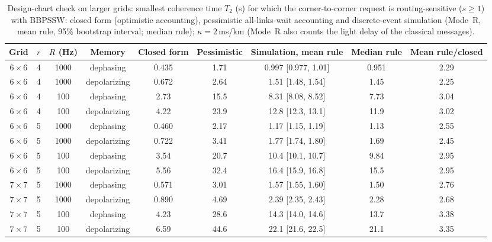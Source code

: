 \begin{table}[!t]
\centering
\caption{Design-chart check on larger grids: smallest coherence time $T_2$ (s) for which the corner-to-corner request is routing-sensitive ($s\ge1$) with BBPSSW: closed form (optimistic accounting), pessimistic all-links-wait accounting and discrete-event simulation (Mode~R, mean rule, 95\% bootstrap interval; median rule); $\kappa=2$\,ms/km (Mode~R also counts the light delay of the classical messages).}
\label{tab:dessix}
\footnotesize
\setlength{\tabcolsep}{4pt}
\begin{tabular}{ccccccccc}
\toprule
Grid & $r$ & $R$ (Hz) & Memory & Closed form & Pessimistic & Simulation, mean rule & Median rule & Mean rule/closed \\
\midrule
$6\times6$ & 4 & 1000 & dephasing & 0.435 & 1.71 & 0.997 [0.977, 1.01] & 0.951 & 2.29\\
$6\times6$ & 4 & 1000 & depolarizing & 0.672 & 2.64 & 1.51 [1.48, 1.54] & 1.45 & 2.25\\
$6\times6$ & 4 & 100 & dephasing & 2.73 & 15.5 & 8.31 [8.08, 8.52] & 7.73 & 3.04\\
$6\times6$ & 4 & 100 & depolarizing & 4.22 & 23.9 & 12.8 [12.3, 13.1] & 11.9 & 3.02\\
$6\times6$ & 5 & 1000 & dephasing & 0.460 & 2.17 & 1.17 [1.15, 1.19] & 1.13 & 2.55\\
$6\times6$ & 5 & 1000 & depolarizing & 0.722 & 3.41 & 1.77 [1.74, 1.80] & 1.69 & 2.45\\
$6\times6$ & 5 & 100 & dephasing & 3.54 & 20.7 & 10.4 [10.1, 10.7] & 9.84 & 2.95\\
$6\times6$ & 5 & 100 & depolarizing & 5.56 & 32.4 & 16.4 [15.9, 16.8] & 15.5 & 2.95\\
$7\times7$ & 5 & 1000 & dephasing & 0.571 & 3.01 & 1.57 [1.55, 1.60] & 1.50 & 2.76\\
$7\times7$ & 5 & 1000 & depolarizing & 0.890 & 4.69 & 2.39 [2.35, 2.43] & 2.28 & 2.68\\
$7\times7$ & 5 & 100 & dephasing & 4.23 & 28.6 & 14.3 [14.0, 14.6] & 13.7 & 3.38\\
$7\times7$ & 5 & 100 & depolarizing & 6.59 & 44.6 & 22.1 [21.6, 22.5] & 21.1 & 3.35\\
\bottomrule
\end{tabular}
\end{table}
